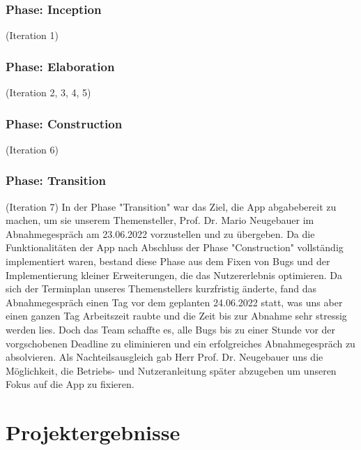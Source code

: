 \documentclass[10pt]{article}
\begin{document}
\subsubsection{Phase: Inception}
(Iteration 1)
\subsubsection{Phase: Elaboration}
(Iteration 2, 3, 4, 5)
\subsubsection{Phase: Construction}
(Iteration 6)
\subsubsection{Phase: Transition}
(Iteration 7)
In der Phase "Transition" war das Ziel, die App abgabebereit zu machen, um sie unserem Themensteller, Prof. Dr. Mario Neugebauer im Abnahmegespräch am 23.06.2022 vorzustellen
und zu übergeben. Da die Funktionalitäten der App nach Abschluss der Phase "Construction" vollständig implementiert waren, bestand diese Phase aus dem Fixen von Bugs und der 
Implementierung kleiner Erweiterungen, die das Nutzererlebnis optimieren. Da sich der Terminplan unseres Themenstellers kurzfristig änderte, fand das Abnahmegespräch einen Tag
vor dem geplanten 24.06.2022 statt, was uns aber einen ganzen Tag Arbeitszeit raubte und die Zeit bis zur Abnahme sehr stressig werden lies. Doch das Team schaffte es, alle Bugs
bis zu einer Stunde vor der vorgschobenen Deadline zu eliminieren und ein erfolgreiches Abnahmegespräch zu absolvieren. Als Nachteilsausgleich gab Herr Prof. Dr. Neugebauer uns
die Möglichkeit, die Betriebs- und Nutzeranleitung später abzugeben um unseren Fokus auf die App zu fixieren.

\section{Projektergebnisse}
\end{document}
